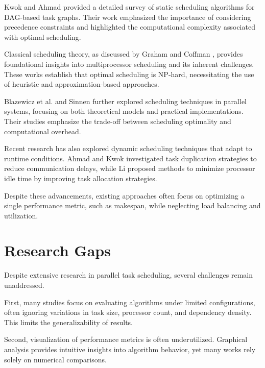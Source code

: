 \documentclass[12pt,a4paper]{article}
\begin{document}
Kwok and Ahmad \cite{kwok} provided a detailed survey of static scheduling algorithms for DAG-based task graphs. Their work emphasized the importance of considering precedence constraints and highlighted the computational complexity associated with optimal scheduling.

Classical scheduling theory, as discussed by Graham \cite{graham} and Coffman \cite{coffman}, provides foundational insights into multiprocessor scheduling and its inherent challenges. These works establish that optimal scheduling is NP-hard, necessitating the use of heuristic and approximation-based approaches.

Blazewicz et al. \cite{blazewicz} and Sinnen \cite{sinnen} further explored scheduling techniques in parallel systems, focusing on both theoretical models and practical implementations. Their studies emphasize the trade-off between scheduling optimality and computational overhead.

Recent research has also explored dynamic scheduling techniques that adapt to runtime conditions. Ahmad and Kwok \cite{ahmad} investigated task duplication strategies to reduce communication delays, while Li \cite{li} proposed methods to minimize processor idle time by improving task allocation strategies.

Despite these advancements, existing approaches often focus on optimizing a single performance metric, such as makespan, while neglecting load balancing and utilization. 


	
	\newpage
\section{Research Gaps}

Despite extensive research in parallel task scheduling, several challenges remain unaddressed.

First, many studies focus on evaluating algorithms under limited configurations, often ignoring variations in task size, processor count, and dependency density. This limits the generalizability of results.

Second, visualization of performance metrics is often underutilized. Graphical analysis provides intuitive insights into algorithm behavior, yet many works rely solely on numerical comparisons.
\end{document}
